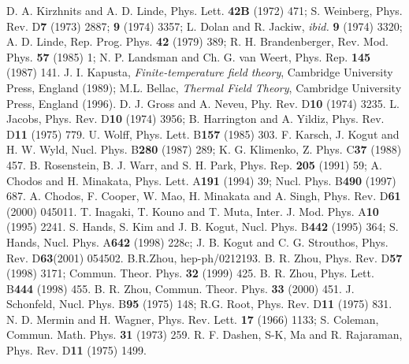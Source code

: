 \documentclass[a4paper,eqsecnum]{revtex4}
\begin{document}
\begin{thebibliography}{99}
  D. A. Kirzhnits and A. D. Linde, Phys. Lett.  {\bf 42B} 
                (1972) 471;
                S. Weinberg, Phys. Rev. D{\bf 7} (1973) 2887;
                {\bf 9} (1974) 3357; 
                L. Dolan and R. Jackiw, {\it ibid.} {\bf 9} (1974) 3320;
  A. D. Linde, Rep. Prog. Phys. {\bf 42} (1979) 389;
                R. H. Brandenberger, Rev. Mod. Phys. {\bf 57} (1985) 1;
  N. P. Landsman and Ch. G. van Weert, Phys. Rep. {\bf 145}
                (1987) 141. 
  J. I. Kapusta, {\it Finite-temperature field theory}, Cambridge University Press, England (1989);
                M.L. Bellac,  {\it Thermal Field Theory},   Cambridge University
                Press, England (1996).                
  D. J. Gross and A. Neveu, Phy. Rev. D{\bf 10} (1974) 3235.
  L. Jacobs, Phys. Rev. D{\bf 10} (1974) 3956;
                B. Harrington and A. Yildiz, Phys. Rev. D{\bf 11} (1975) 779.
  U. Wolff, Phys. Lett. B{\bf 157} (1985) 303.
  F. Karsch, J. Kogut and H. W. Wyld, Nucl. Phys. B{\bf 280} (1987) 289;
                K. G. Klimenko, Z. Phys. C{\bf 37} (1988) 457.
 B. Rosenstein, B. J. Warr, and S. H. Park, Phys. Rep. {\bf 205}                (1991) 59; 
 A. Chodos and H. Minakata, Phys. Lett. A{\bf 191} (1994) 39; 
                Nucl. Phys. B{\bf 490} (1997) 687.
 A. Chodos, F. Cooper, W. Mao, H. Minakata and A. Singh, Phys. Rev. D{\bf 61} (2000) 045011.
 T. Inagaki, T. Kouno and T. Muta, Inter. J. Mod. Phys. A{\bf 10} (1995) 2241.
 S. Hands, S. Kim and J. B. Kogut, Nucl. Phys. B{\bf 442} (1995) 364;
                S. Hands, Nucl. Phys. A{\bf 642} (1998) 228c;
                J. B. Kogut and C. G. Strouthos, Phys. Rev. D{\bf 63}(2001) 054502.
 B.R.Zhou,  hep-ph/0212193.
 B. R. Zhou, Phys. Rev. D{\bf 57} (1998) 3171; 
                Commun. Theor. Phys. {\bf 32} (1999) 425.
 B. R. Zhou, Phys. Lett. B{\bf 444} (1998) 455.
 B. R. Zhou, Commun. Theor. Phys. {\bf 33} (2000) 451.
 J. Schonfeld, Nucl. Phys. B{\bf 95} (1975) 148;
                R.G. Root, Phys. Rev. D{\bf 11} (1975) 831.
 N. D. Mermin and H. Wagner, Phys. Rev. Lett. {\bf 17} (1966) 1133;
                S. Coleman, Commun. Math. Phys. {\bf 31} (1973) 259.
 R. F. Dashen, S-K, Ma and R. Rajaraman, Phys. Rev. D{\bf 11}                 (1975) 1499.
\end{thebibliography}
\end{document}
